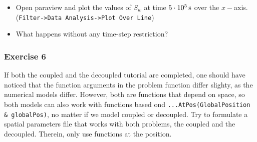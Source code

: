 \begin{itemize}
 \item Open paraview and plot the values of $S_w$ at time $\unit[5 \cdot 10^5]{s}$ over the $x-$axis.\\ (\texttt{Filter->Data Analysis->Plot Over Line}) 
 \item What happens without any time-step restriction?
\end{itemize}

\subsubsection{Exercise 6}
If both the coupled and the decoupled tutorial are completed, one should have noticed that the function arguments in the problem function differ slighty, as the numerical models differ. However, both are functions that depend on space, so both models can also work with functions based ond \mbox{\texttt{...AtPos(GlobalPosition \& globalPos)}}, no matter if we model coupled or decoupled. Try to formulate a spatial parameters file that works with both problems, the coupled and the decoupled. Therein, only use functions at the position.

